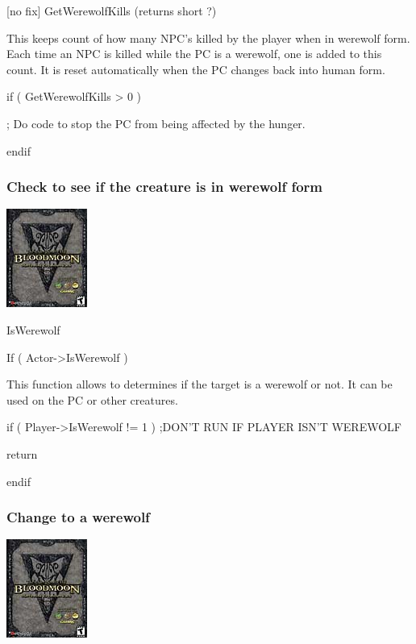 \documentclass[
]{article}
\begin{document}
{[}no fix{]} GetWerewolfKills (returns short ?)

This keeps count of how many NPC's killed by the player when in werewolf
form. Each time an NPC is killed while the PC is a werewolf, one is
added to this count. It is reset automatically when the PC changes back
into human form.

if ( GetWerewolfKills \textgreater{} 0 )

; Do code to stop the PC from being affected by the hunger.

endif

\hypertarget{check-to-see-if-the-creature-is-in-werewolf-form}{%
\subsubsection{Check to see if the creature is in werewolf
form}\label{check-to-see-if-the-creature-is-in-werewolf-form}}

\includegraphics{media/image7.png}

IsWerewolf

If ( Actor-\textgreater IsWerewolf )

This function allows to determines if the target is a werewolf or not.
It can be used on the PC or other creatures.

if ( Player-\textgreater IsWerewolf != 1 ) ;DON'T RUN IF PLAYER ISN'T
WEREWOLF

return

endif

\hypertarget{change-to-a-werewolf}{%
\subsubsection{Change to a werewolf}\label{change-to-a-werewolf}}

\includegraphics{media/image7.png}
\end{document}
